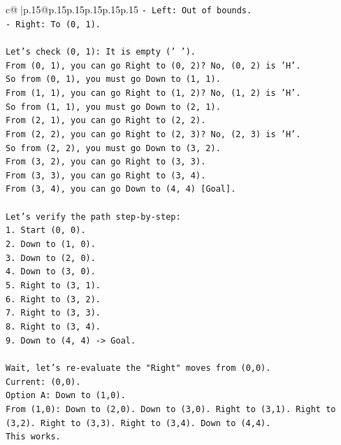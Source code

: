 \documentclass{article}
\begin{document}
{\begin{supertabular}{c@{$\;$}|p{.15\linewidth}@{}p{.15\linewidth}p{.15\linewidth}p{.15\linewidth}p{.15\linewidth}p{.15\linewidth}}
{{{\texttt{{-} Left: Out of bounds.} \\
\texttt{{-} Right: To (0, 1).} \\
\\ 
\texttt{Let's check (0, 1): It is empty (' ').} \\
\texttt{From (0, 1), you can go Right to (0, 2)? No, (0, 2) is 'H'.} \\
\texttt{So from (0, 1), you must go Down to (1, 1).} \\
\texttt{From (1, 1), you can go Right to (1, 2)? No, (1, 2) is 'H'.} \\
\texttt{So from (1, 1), you must go Down to (2, 1).} \\
\texttt{From (2, 1), you can go Right to (2, 2).} \\
\texttt{From (2, 2), you can go Right to (2, 3)? No, (2, 3) is 'H'.} \\
\texttt{So from (2, 2), you must go Down to (3, 2).} \\
\texttt{From (3, 2), you can go Right to (3, 3).} \\
\texttt{From (3, 3), you can go Right to (3, 4).} \\
\texttt{From (3, 4), you can go Down to (4, 4) {[}Goal{]}.} \\
\\ 
\texttt{Let's verify the path step{-}by{-}step:} \\
\texttt{1. Start (0, 0).} \\
\texttt{2. Down to (1, 0).} \\
\texttt{3. Down to (2, 0).} \\
\texttt{4. Down to (3, 0).} \\
\texttt{5. Right to (3, 1).} \\
\texttt{6. Right to (3, 2).} \\
\texttt{7. Right to (3, 3).} \\
\texttt{8. Right to (3, 4).} \\
\texttt{9. Down to (4, 4) {-}> Goal.} \\
\\ 
\texttt{Wait, let's re{-}evaluate the "Right" moves from (0,0).} \\
\texttt{Current: (0,0).} \\
\texttt{Option A: Down to (1,0).} \\
\texttt{From (1,0): Down to (2,0). Down to (3,0). Right to (3,1). Right to (3,2). Right to (3,3). Right to (3,4). Down to (4,4).} \\
\texttt{This works.} \\
}}}
\end{supertabular}}
\end{document}
